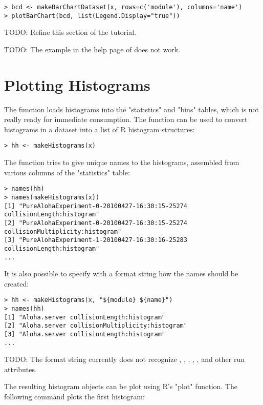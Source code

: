 \begin{verbatim}
> bcd <- makeBarChartDataset(x, rows=c('module'), columns='name')
> plotBarChart(bcd, list(Legend.Display="true"))
\end{verbatim}

TODO: Refine this section of the tutorial.

TODO: The example in the help page of  does not work.


\section{Plotting Histograms}

The  function loads histograms into the "statistics" and "bins" tables,
which is not really ready for immediate consumption. The  function
can be used to convert histograms in a dataset into a list of R histogram structures:

\begin{verbatim}
> hh <- makeHistograms(x)
\end{verbatim}

The function tries to give unique names to the histograms, assembled from various columns
of the "statistics" table:

\begin{verbatim}
> names(hh)
> names(makeHistograms(x))
[1] "PureAlohaExperiment-0-20100427-16:30:15-25274 collisionLength:histogram"
[2] "PureAlohaExperiment-0-20100427-16:30:15-25274 collisionMultiplicity:histogram"
[3] "PureAlohaExperiment-1-20100427-16:30:16-25283 collisionLength:histogram"
...
\end{verbatim}

It is also possible to specify with a format string how the names should be created:

\begin{verbatim}
> hh <- makeHistograms(x, "${module} ${name}")
> names(hh)
[1] "Aloha.server collisionLength:histogram"      
[2] "Aloha.server collisionMultiplicity:histogram"
[3] "Aloha.server collisionLength:histogram"      
...
\end{verbatim}

TODO: The format string currently does not recognize , 
, , ,
,  and other run attributes.

The resulting histogram objects can be plot using R's "plot" function. The
following command plots the first histogram:

